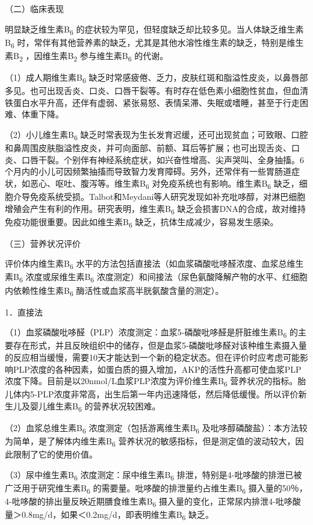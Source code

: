 （二）临床表现

明显缺乏维生素B\textsubscript{6}
的症状较为罕见，但轻度缺乏却比较多见。当人体缺乏维生素B\textsubscript{6}
时，常伴有其他营养素的缺乏，尤其是其他水溶性维生素的缺乏，特别是维生素B\textsubscript{2}
，因维生素B\textsubscript{2} 参与维生素B\textsubscript{6} 的代谢。

（1）成人期维生素B\textsubscript{6}
缺乏时常感疲倦、乏力，皮肤红斑和脂溢性皮炎，以鼻唇部多见。也可出现舌炎、口炎、口唇干裂等。有时存在低色素小细胞性贫血，但血清铁蛋白水平升高，还伴有虚弱、紧张易怒、表情呆滞、失眠或嗜睡，甚至于行走困难、体重下降。

（2）小儿维生素B\textsubscript{6}
缺乏时常表现为生长发育迟缓，还可出现贫血；可致眼、口腔和鼻周围皮肤脂溢性皮炎，并可向面部、前额、耳后等扩展；也可出现舌炎、口炎、口唇干裂。个别伴有神经系统症状，如兴奋性增高、尖声哭叫、全身抽搐。6个月内的小儿可因频繁抽搐而导致智力发育障碍。另外，还常伴有一些胃肠道症状，如恶心、呕吐、腹泻等。维生素B\textsubscript{6}
对免疫系统也有影响。维生素B\textsubscript{6}
缺乏，细胞介导免疫系统受损。Talbot和Meydani等人研究发现如补充吡哆醇，对淋巴细胞增殖会产生有利的作用。研究表明，维生素B\textsubscript{6}
缺乏会损害DNA的合成，故对维持免疫功能很重要。因此如维生素B\textsubscript{6}
缺乏，抗体生成减少，容易发生感染。

（三）营养状况评价

评价体内维生素B\textsubscript{6}
水平的方法包括直接法（如血浆磷酸吡哆醛浓度、血浆总维生素B\textsubscript{6}
浓度或尿维生素B\textsubscript{6}
浓度测定）和间接法（尿色氨酸降解产物的水平、红细胞内依赖性维生素B\textsubscript{6}
酶活性或血浆高半胱氨酸含量的测定）。

{1．直接法}

（1）血浆磷酸吡哆醛（PLP）浓度测定：血浆5-磷酸吡哆醛是肝脏维生素B\textsubscript{6}
的主要存在形式，并且反映组织中的储存，但是血浆5-磷酸吡哆醛对该种维生素摄入量的反应相当缓慢，需要10天才能达到一个新的稳定状态。但在评价时应考虑可能影响PLP浓度的各种因素，如蛋白质的摄入增加，AKP的活性升高都可使血浆PLP浓度下降。目前是以20nmol/L血浆PLP浓度为评价维生素B\textsubscript{6}
营养状况的指标。胎儿体内5-PLP浓度非常高，出生后第一年内迅速降低，然后降低缓慢。所以评价新生儿及婴儿维生素B\textsubscript{6}
的营养状况较困难。

（2）血浆总维生素B\textsubscript{6}
浓度测定（包括游离维生素B\textsubscript{6}
及吡哆醇磷酸盐）：本方法较为简单，是了解体内维生素B\textsubscript{6}
营养状况的敏感指标，但是测定值的波动较大，因此限制了它的使用价值。

（3）尿中维生素B\textsubscript{6} 浓度测定：尿中维生素B\textsubscript{6}
排泄，特别是4-吡哆酸的排泄已被广泛用于研究维生素B\textsubscript{6}
的需要量。吡哆酸的排泄量约占维生素B\textsubscript{6}
摄入量的50％，4-吡哆酸的排出量反映近期膳食维生素B\textsubscript{6}
摄入量的变化，正常尿内排泄4-吡哆酸量＞0.8mg/d，如果＜0.2mg/d，即表明维生素B\textsubscript{6}
缺乏。

